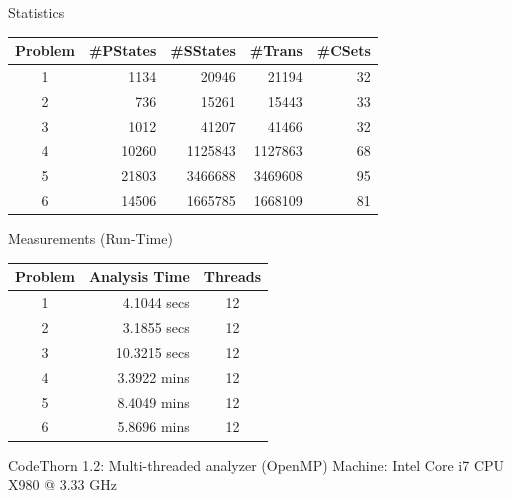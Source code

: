 \begin{frame}{Statistics}
\begin{center}
\begin{tabular}{|c|r|r|r|r|}\hline
Problem & \#PStates &\#SStates &\#Trans &\#CSets \\\hline\hline
1 &1134 & 20946 & 21194 & 32 \\\hline
2 &736 & 15261 & 15443 & 33 \\\hline
3 &1012 & 41207 & 41466 & 32 \\\hline
4 &10260 & 1125843 & 1127863 & 68 \\\hline
5 &21803 & 3466688 & 3469608 & 95 \\\hline
6 &14506 & 1665785 & 1668109 & 81 \\\hline
\end{tabular}
\end{center}
\end{frame}

\begin{frame}{Measurements (Run-Time)}
\begin{center}
\begin{tabular}{|c|r|c|}\hline
Problem& Analysis Time & Threads\\\hline\hline
1& 4.1044 secs & 12\\\hline
2& 3.1855 secs& 12\\\hline
3& 10.3215 secs& 12\\\hline
4& 3.3922 mins& 12\\\hline
5& 8.4049 mins& 12\\\hline
6& 5.8696 mins& 12\\\hline
\end{tabular}

\vspace{0.5cm}
CodeThorn 1.2: Multi-threaded analyzer (OpenMP)
Machine: Intel Core i7 CPU X980 @ 3.33 GHz
\end{center}

\end{frame}

